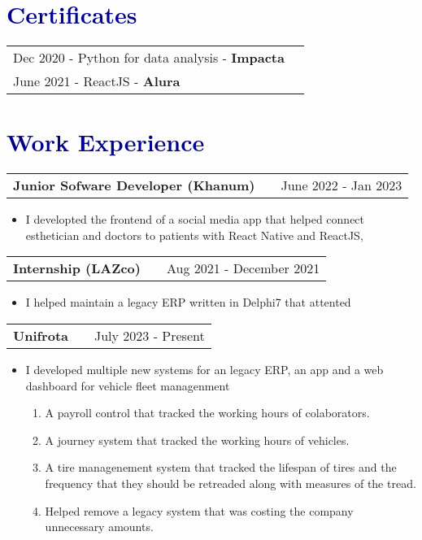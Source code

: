 \documentclass[a4paper,12pt]{article}
\makeatletter
\newenvironment{joblong}[2]
    {
    \begin{tabularx}{\linewidth}{@{}l X r@{}}
    \textbf{#1} & \hfill &  #2 \\[3.75pt]
    \end{tabularx}
    \begin{minipage}[t]{\linewidth}
    \begin{itemize}[nosep,after=\strut, leftmargin=1em, itemsep=3pt,label=--]
    }
    {
    \end{itemize}
    \end{minipage}    
    }
\makeatother
\begin{document}
\section{{\textcolor{darkblue}{\textbf{Certificates}}}}
\begin{tabularx}{\linewidth}{@{}l X@{}}	

Dec 2020 - Python for data analysis  - \textbf{Impacta} \\

June 2021 - ReactJS - \textbf{Alura} \\

\end{tabularx}


\section{\textcolor{darkblue}{\textbf{Work Experience}}}

\begin{joblong}{Junior Sofware Developer (Khanum)}{June 2022 - Jan 2023}
\item I developted the frontend of a social media app that helped connect esthetician and doctors
to patients with React Native and ReactJS,
\end{joblong}

\begin{joblong}{Internship (LAZco)}{Aug 2021 - December 2021}
\item I helped maintain a legacy ERP written in Delphi7 that attented 
	
\end{joblong}

\begin{joblong}{Unifrota}{July 2023 - Present}
\item I developed multiple new systems for an legacy ERP, an app and a web dashboard for vehicle fleet managenment 
	\begin{enumerate}
		\item A payroll control that tracked the working hours of colaborators.
		\item A journey system that tracked the working hours of vehicles.
		\item A tire managenement system that tracked the lifespan of tires and the frequency that they should be retreaded along with measures of the tread.
		\item  Helped remove a legacy system that was costing the company unnecessary amounts.
	\end{enumerate}
	
\end{joblong}
\end{document}
